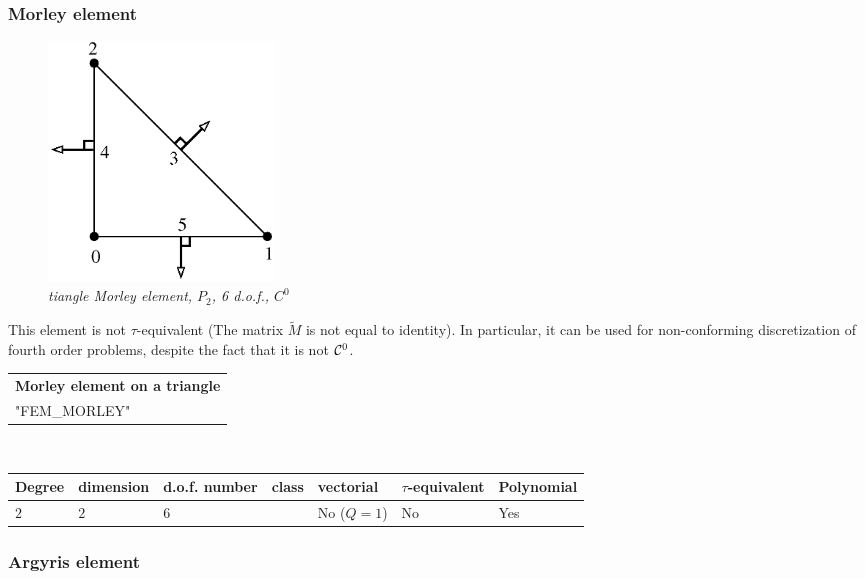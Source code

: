 \documentclass[10pt,a4paper]{article}
\begin{document}
\subsubsection{Morley element}

\begin{figure}[H]
  \begin{center}
    \includegraphics[width=6cm,angle=0]{getfemlist_morley.eps}
  \end{center}
  \caption{ \it tiangle Morley element, $P_2$, 6 d.o.f., $C^0$ }
  \label{fig:triangle_morley}
\end{figure}

This element is not \mbox{$\tau$-equivalent} (The matrix $\tilde{M}$ is not equal to identity). In particular, it can be used for non-conforming discretization of fourth order problems, despite the fact that it is not ${\cal C}^0$.

\begin{center}
\begin{tabular}{|m{16.11cm}|} \hline 
{ \bf Morley element on a triangle}\\
"FEM\_MORLEY"
\end{tabular} \\ \vspace{-1pt} 
\begin{tabular}{|m{2cm}|m{2cm}|m{2.5cm}|m{1.2cm}|m{2cm}|m{2cm}|m{1.8cm}|} \hline 
Degree & dimension & d.o.f. number & class & vectorial & \mbox{$\tau$-equivalent} & Polynomial\\ \hline
$2$ & $2$ & $6$ &  & No \mbox{($Q = 1$)} & No & Yes\\ \hline
\end{tabular}
\end{center}

\subsubsection{Argyris element}
\end{document}
